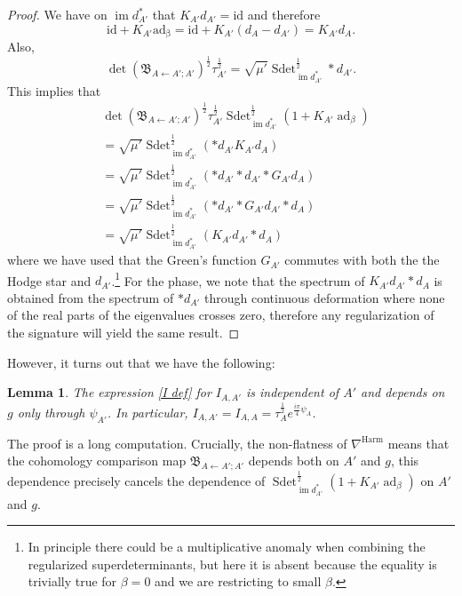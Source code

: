 \documentclass[11pt,a4paper]{amsart}
\theoremstyle{plain} %
\newtheorem{lem}[thm]{Lemma}
\theoremstyle{definition}
\theoremstyle{remark}
\newcommand{\im}{\operatorname{im}}
\newcommand{\sdet}{\operatorname{Sdet}}
\newcommand{\mr}{\mathrm}
\newcommand{\la}{\leftarrow}
\newcommand{\BB}{\mathfrak{B}}
\begin{document}
{%
\begin{proof}
    We have on $\im d_{A'}^*$ that $K_{A'}d_{A'} = \mr{id}$ and therefore
    $$ \mr{id} + K_{A'}\mathrm{ad_\beta} = \mr{id} + K_{A'}(d_{A} - d_{A'}) = K_{A'}d_{A}.$$  
    Also, 
    $$ \det(\BB_{A\la A';A'})^{\frac12}
    \tau_{A'}^\frac12 = \sqrt{\mu'}\sdet^\frac12_{\im d_{A'}^*} *d_{A'}.$$
    This implies that 
    \begin{align*} & %
    \det(\BB_{A\la A';A'})^{\frac12}
    \tau_{A'}^\frac12\sdet^{\frac{1}{2}}_{\im d_{A'}^*}\left(1 + K_{A'}\operatorname{ad}_\beta\right) \\
    &= \sqrt{\mu'}\sdet_{\im d_{A'}^*}^\frac12(*d_{A'}K_{A'}d_{A}) \\
    &= \sqrt{\mu'}\sdet_{\im d_{A'}^*}^\frac12(*d_{A'}* d_{A'}* G_{A'}d_{A}) \\
    &= \sqrt{\mu'}\sdet_{\im d_{A'}^*}^\frac12(*d_{A'}* G_{A'} d_{A'}* %
    d_{A})\\
    &= \sqrt{\mu'}\sdet_{\im d_{A'}^*}^\frac12(K_{A'}d_{A'}*d_{A})
    \end{align*}
    where we have used that the Green's function $G_{A'}$ commutes with both the the Hodge star and $d_{A'}$.\footnote{In principle there could be a multiplicative anomaly when combining the regularized superdeterminants, but here it is absent because the equality is trivially true for $\beta = 0$ and we are restricting to small $\beta$.}
    For the phase, we note that the spectrum of $K_{A'}d_{A'} * d_{A}$ is obtained from the spectrum of $*d_{A'}$ through continuous deformation where none of the 
  real parts of the eigenvalues  crosses zero, therefore any regularization of the signature will yield the same result. 
  \end{proof}
However, it turns out that we have the following: 
\begin{lem}
    The expression \eqref{I def} for $I_{A,A'}$ is independent of $A'$ and depends on $g$ only through $\psi_{A'}$. In particular, $I_{A,A'} = I_{A,A} = \tau^\frac12_Ae^{\frac{i\pi}{4}\psi_A}$. 
\end{lem}
The proof is a long computation. Crucially, the non-flatness of $\nabla^\mr{Harm}$ means that the cohomology comparison map $\BB_{A\la A';A'}$ depends both on $A'$ and $g$, this dependence precisely cancels the dependence of $\sdet^{\frac{1}{2}}_{\im d_{A'}^*}\left(1 + K_{A'}\operatorname{ad}_\beta\right)$ on $A'$ and $g$. 


}
\end{document}
